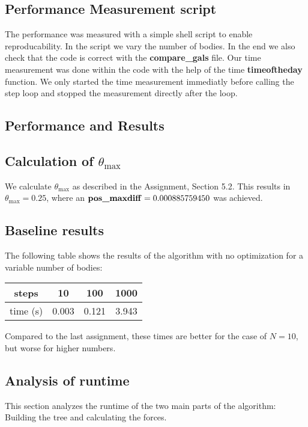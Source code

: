 \documentclass[a4paper]{scrartcl}
\begin{document}
    \subsection{Performance Measurement script}
        The performance was measured with a simple shell script to enable
        reproducability. In the script we vary the number of bodies. In the end
        we also check that the code is correct with the \textbf{compare\_gals} file. Our
        time measurement was done within the code with the help of the time
        \textbf{timeoftheday} function. We only started the time measurement
        immediatly before calling the step loop and stopped the measurement
        directly after the loop.

    \subsection{Performance and Results}

        \subsection{Calculation of $\theta_{\max}$}
        
            We calculate $\theta_{\max}$ as described in the Assignment, Section
            5.2. This results in $\theta_{\max} = 0.25$, where an $\text{\textbf{pos\_maxdiff}}
            = 0.000885759450$ was achieved.

        \subsection{Baseline results}
            The following table shows the results of the algorithm with no
            optimization for a variable number of bodies:
            \noindent\begin{tabular}{c|c|c|c}
                steps & 10 & 100 & 1000 \\
                \hline
                time (s) & 0.003 & 0.121 & 3.943\\
            \end{tabular}

            Compared to the last assignment, these times are better for the case
            of $N=10$, but worse for higher numbers.

        \subsection{Analysis of runtime}
            This section analyzes the runtime of the two main parts of the
            algorithm: Building the tree and calculating the forces.
\end{document}
